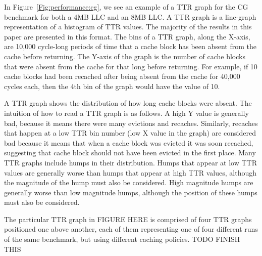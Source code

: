 In Figure~\ref{Fig:performance:cg}, we see an example of a TTR graph for 
the CG benchmark for both a 4MB LLC and an 8MB LLC.  A TTR graph is a
line-graph representation of a histogram of TTR values.  The majority of
the results in this paper are presented in this format.  The bins of a
TTR graph, along the X-axis,  are 10,000 cycle-long periods of time that a cache block has
been absent from the cache before returning.  The Y-axis of the graph
is the number of cache blocks that were absent from the cache for that
long before returning.  For example, if 10 cache blocks had been
recached after being absent from the cache for 40,000 cycles each,
then the 4th bin of the graph would have the value of 10.

A TTR graph shows the distribution of how long cache blocks were
absent.  The intuition of how to read a TTR graph is as follows.  A
high Y value is generally bad, because it means there were many evictions
and recaches.  Similarly, recaches that happen at a low TTR bin number
(low X value in the graph) are considered bad because it means that
when a cache block was evicted it was soon recached, suggesting that
cache block should not have been evicted in the first place.  Many TTR
graphs include humps in their distribution.  Humps that appear at low
TTR values are generally worse than humps that appear at high TTR
values, although the magnitude of the hump must also be considered.
High magnitude humps are generally worse than low magnitude humps,
although the position of these humps must also be considered.

The particular TTR graph in FIGURE HERE is comprised of four TTR
graphs positioned one above another, each of them representing one of
four different runs of the same benchmark, but using different caching
policies.  TODO FINISH THIS
